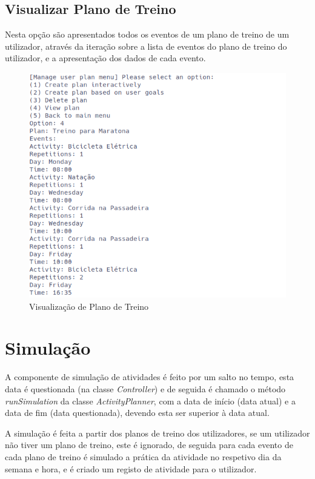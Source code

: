 \documentclass[a4paper,12pt]{scrreprt}
\begin{document}
    \clearpage
    \subsection{Visualizar Plano de Treino}
    Nesta opção são apresentados todos os eventos de um plano de treino de um utilizador,
    através da iteração sobre a lista de eventos do plano de treino do utilizador,
    e a apresentação dos dados de cada evento.

    \begin{figure}[!ht]
        \centering
        \includegraphics[width=\textwidth]{images/viewPlan.png}
        \caption{Visualização de Plano de Treino}
        \label{fig:view-plan}
    \end{figure}

\clearpage
\section{Simulação}
    \label{sec:simulacao}
    A componente de simulação de atividades é feito por um salto no tempo,
    esta data é questionada (na classe \textit{Controller}) e de seguida
    é chamado o método \textit{runSimulation} da classe \textit{ActivityPlanner},
    com a data de início (data atual) e a data de fim (data questionada),
    devendo esta ser superior à data atual.

    A simulação é feita a partir dos planos de treino dos utilizadores,
    se um utilizador não tiver um plano de treino, este é ignorado,
    de seguida para cada evento de cada plano de treino é simulado a prática da atividade
    no respetivo dia da semana e hora, e é criado um registo de atividade para o utilizador.
\end{document}
